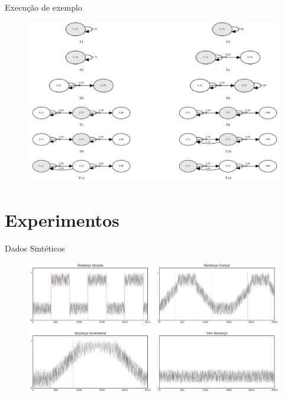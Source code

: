 \documentclass[10pt]{beamer}
\begin{document}
\begin{frame}{Execução de exemplo}
    \begin{figure}[H]
        \begin{center}
            \includegraphics[width=\textwidth]{imagens/evolucao_markov.png}
        \end{center}
    \end{figure}
\end{frame}


\section{Experimentos}

\begin{frame}{Dados Sintéticos}
    \begin{figure}[ht]
        \begin{center}
            \includegraphics[width=\textwidth]{imagens/conjuntos_dados_sinteticos.png}
        \end{center}
    \end{figure}
\end{frame}
\end{document}
